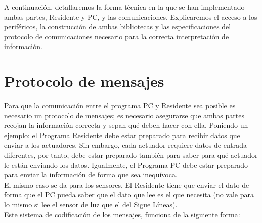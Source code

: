 A continuación, detallaremos la forma técnica en la que se han implementado ambas partes, Residente y PC, y las comunicaciones. Explicaremos el acceso a los periféricos, la construcción de ambas bibliotecas y las especificaciones del protocolo de comunicaciones necesario para la correcta interpretación de información. 

\section{Protocolo de mensajes}\label{sec:protocolomensajes}
Para que la comunicación entre el programa PC y Residente sea posible es necesario un protocolo de mensajes; es necesario asegurarse que ambas partes recojan la información correcta y sepan qué deben hacer con ella. Poniendo un ejemplo: el Programa Residente debe estar preparado para recibir datos que enviar a los actuadores. Sin embargo, cada actuador requiere datos de entrada diferentes, por tanto, debe estar preparado también para saber para qué actuador le están enviando los datos. Igualmente, el Programa PC debe estar preparado para enviar la información de forma que sea inequívoca. \\
El mismo caso se da para los sensores. El Residente tiene que enviar el dato de forma que el PC pueda saber que el dato que lee es el que necesita (no vale para lo mismo si lee el sensor de luz que el del Sigue Líneas). \\
Este sistema de codificación de los mensajes, funciona de la siguiente forma:
